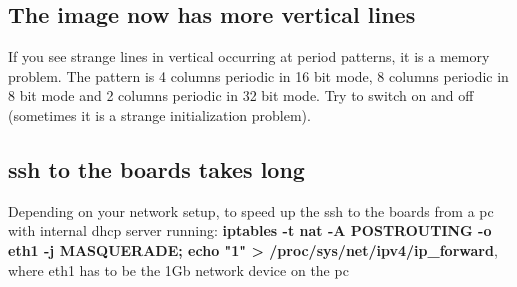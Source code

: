 \documentclass{article}
\begin{document}
\subsection{The image now has more vertical lines}

If you see strange lines in vertical occurring at period patterns, it is a memory problem. The pattern is 4 columns periodic in 16 bit mode, 8 columns periodic in 8 bit mode and 2 columns periodic in 32 bit mode. Try to switch on and off (sometimes it is a strange initialization problem).

\subsection{ssh to the boards takes long}
Depending on your network setup,  to speed up the ssh to the boards from a pc with internal dhcp server running: \textbf{iptables -t nat -A POSTROUTING -o eth1 -j MASQUERADE; echo "1" > /proc/sys/net/ipv4/ip\_forward}, where eth1 has to be the 1Gb network device on the pc
\end{document}
